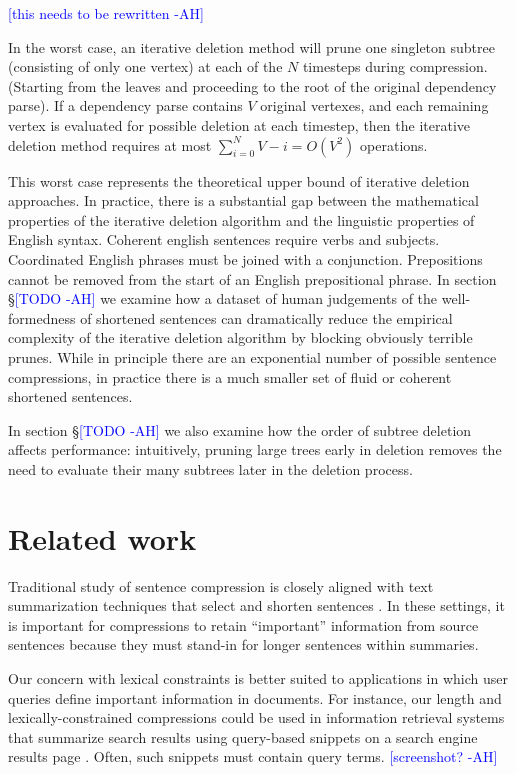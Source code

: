 \documentclass[11pt,a4paper]{article}
\newcommand{\ahcomment}[1]{\textcolor{blue}{[#1 -AH]}}
\begin{document}
\ahcomment{this needs to be rewritten}

In the worst case, an iterative deletion method will prune one singleton subtree (consisting of only one vertex) at each of the $N$ timesteps during compression. (Starting from the leaves and proceeding to the root of the original dependency parse). If a dependency parse contains $V$ original vertexes, and each remaining vertex is evaluated for possible deletion at each timestep, then the iterative deletion method requires at most ${\sum_{i = 0}^N V - i = O(V^2)}$ operations.

This worst case represents the theoretical upper bound of iterative deletion approaches. In practice, there is a substantial gap between the mathematical properties of the iterative deletion algorithm and the linguistic properties of English syntax. Coherent english sentences require verbs and subjects. Coordinated English phrases must be joined with a conjunction. Prepositions cannot be removed from the start of an English prepositional phrase. In section \S\ahcomment{TODO} we examine how a dataset of human judgements of the well-formedness of shortened sentences can dramatically reduce the empirical complexity of the iterative deletion algorithm by blocking obviously terrible prunes. While in principle there are an exponential number of possible sentence compressions, in practice there is a much smaller set of fluid or coherent shortened sentences. 

In section \S\ahcomment{TODO} we also examine how the order of subtree deletion affects performance: intuitively, pruning large trees early in deletion removes the need to evaluate their many subtrees later in the deletion process.



\section{Related work}

Traditional study of sentence compression is closely aligned with text summarization techniques that select and  shorten sentences \cite{Knight2000StatisticsBasedS,vanderwende2007beyond,clarke2008global,Nenkova2012ASO}. 
In these settings, it is important for compressions to retain ``important'' information from source sentences because they must stand-in for longer sentences within summaries.

Our concern with lexical constraints is better suited to applications in which user queries define important information in documents. For instance, our length and lexically-constrained compressions could be used in information retrieval systems that summarize search results using query-based snippets on a search engine results page \cite{tombros1998advantages,Metzler2008MachineLS}. Often, such snippets must contain query terms. \ahcomment{screenshot?}
\end{document}
